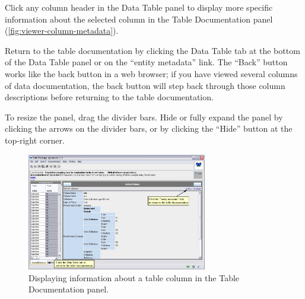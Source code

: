 Click any column header in the Data Table panel to display more specific
information about the selected column in the Table Documentation panel
(\autoref{fig:viewer-column-metadata}).

Return to the table documentation by clicking the Data Table tab at the
bottom of the Data Table panel or on the ``entity metadata'' link. The
``Back'' button works like the back button in a web browser; if you have
viewed several columns of data documentation, the back button will step
back through those column descriptions before returning to the table
documentation. 

To resize the panel, drag the divider bars. Hide or fully expand the
panel by clicking the arrows on the divider bars, or by clicking the
``Hide'' button at the top-right corner. 

\begin{figure}
  \centering
    \includegraphics[width=0.7\textwidth]{images/viewer-column-metadata.jpg}
  \caption{Displaying information about a table column in the Table
    Documentation panel.}
  \label{fig:viewer-column-metadata}
\end{figure}


